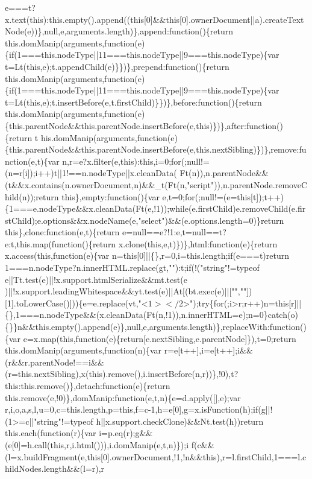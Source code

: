 \begin{DoxyCode}
{       e===t?x.text(this):this.empty().append((this[0]&&this[0].ownerDocument||a).createTextNode(e))\},null,e,arguments.length)\},append:function()\{return
       this.domManip(arguments,function(e)\{if(1===this.nodeType||11===this.nodeType||9===this.nodeType)\{var
       t=Lt(this,e);t.appendChild(e)\}\})\},prepend:function()\{return
       this.domManip(arguments,function(e)\{if(1===this.nodeType||11===this.nodeType||9===this.nodeType)\{var t=Lt(this,e);t.insertBefore(e,t.firstChild)\}\})\},before:function()\{return
       this.domManip(arguments,function(e)\{this.parentNode&&this.parentNode.insertBefore(e,this)\})\},after:function()\{return
       t
      his.domManip(arguments,function(e)\{this.parentNode&&this.parentNode.insertBefore(e,this.nextSibling)\})\},remove:function(e,t)\{var
       n,r=e?x.filter(e,this):this,i=0;for(;null!=(n=r[i]);i++)t||1!==n.nodeType||x.cleanData(
      Ft(n)),n.parentNode&&(t&&x.contains(n.ownerDocument,n)&&\_t(Ft(n,"script")),n.parentNode.removeChild(n));return this\},empty:function()\{var
       e,t=0;for(;null!=(e=this[t]);t++)\{1===e.nodeType&&x.cleanData(Ft(e,!1));while(e.firstChild)e.removeChild(e.firstChild);e.options&&x.nodeName(e,"select")&&(e.options.length=0)\}return
       this\},clone:function(e,t)\{return e=null==e?!1:e,t=null==t?e:t,this.map(function()\{return
       x.clone(this,e,t)\})\},html:function(e)\{return x.access(this,function(e)\{var n=this[0]||\{\},r=0,i=this.length;if(e===t)return
       1===n.nodeType?n.innerHTML.replace(gt,""):t;if(!("string"!=typeof
       e||Tt.test(e)||!x.support.htmlSerialize&&mt.test(e
      )||!x.support.leadingWhitespace&&yt.test(e)||At[(bt.exec(e)||["",""])[1].toLowerCase()]))\{e=e.replace(vt,"<$
      1></$2>");try\{for(;i>r;r++)n=this[r]||\{\},1===n.nodeType&&(x.cleanData(Ft(n,!1)),n.innerHTML=e);n=0\}catch(o)\{\}\}n&&this.empty().append(e)\},null,e,arguments.length)\},replaceWith:function()\{var
       e=x.map(this,function(e)\{return[e.nextSibling,e.parentNode]\}),t=0;return this.domManip(arguments,function(n)\{var
       r=e[t++],i=e[t++];i&&
      (r&&r.parentNode!==i&&(r=this.nextSibling),x(this).remove(),i.insertBefore(n,r))\},!0),t?this:this.remove()\},detach:function(e)\{return this.remove(e,!0)\},domManip:function(e,t,n)\{e=d.apply([],e);var
       r,i,o,a,s,l,u=0,c=this.length,p=this,f=c-1,h=e[0],g=x.isFunction(h);if(g||!(1>=c||"string"!=typeof
       h||x.support.checkClone)&&Nt.test(h))return this.each(function(r)\{var
       i=p.eq(r);g&&(e[0]=h.call(this,r,i.html())),i.domManip(e,t,n)\});i
      f(c&&(l=x.buildFragment(e,this[0].ownerDocument,!1,!n&&this),r=l.firstChild,1===l.childNodes.length&&(l=r),r
}
\end{DoxyCode}
